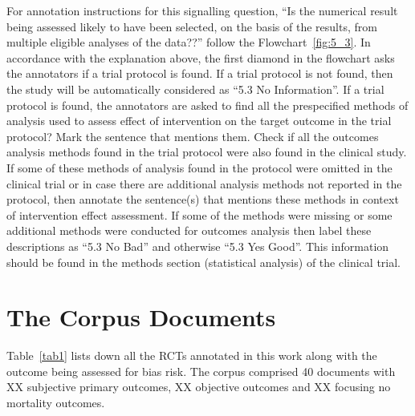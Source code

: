 \documentclass[sn-mathphys,Numbered]{sn-jnl}%
\begin{document}
For annotation instructions for this signalling question, ``Is the numerical result being assessed likely to have been selected, on the basis of the results, from multiple eligible analyses of the data??'' follow the Flowchart~\ref{fig:5_3}.
In accordance with the explanation above, the first diamond in the flowchart asks the annotators if a trial protocol is found.
If a trial protocol is not found, then the study will be automatically considered as ``5.3 No Information''.
If a trial protocol is found, the annotators are asked to find all the prespecified methods of analysis used to assess effect of intervention on the target outcome in the trial protocol?
Mark the sentence that mentions them.
Check if all the outcomes analysis methods found in the trial protocol were also found in the clinical study.
If some of these  methods of analysis found in the protocol were omitted in the clinical trial or in case there are additional analysis methods not reported in the protocol, then annotate the sentence(s) that mentions these methods in context of intervention effect assessment.
If some of the methods were missing or some additional methods were conducted for outcomes analysis then label these descriptions as ``5.3 No Bad'' and otherwise ``5.3 Yes Good''.
This information should be found in the methods section (statistical analysis) of the clinical trial.
%
%
%
\section*{The Corpus Documents}
\label{sec:corpus}
%
Table~\ref{tab1} lists down all the RCTs annotated in this work along with the outcome being assessed for bias risk.
The corpus comprised 40 documents with XX subjective primary outcomes, XX objective outcomes and XX focusing no mortality outcomes.
\end{document}
